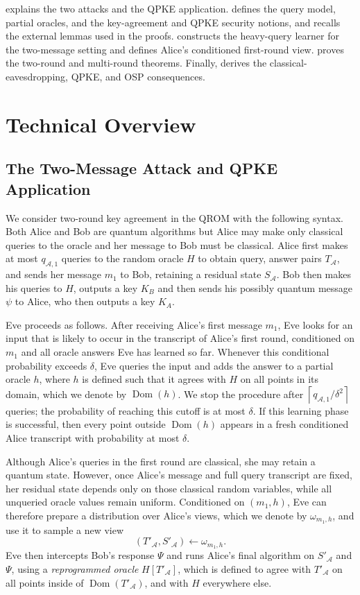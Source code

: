 \documentclass[11pt]{article}
\newcounter{algorithm}
\newcommand{\cA}{\mathcal{A}}
\newcommand{\Dom}{\operatorname{Dom}}
\newcommand{\ceil}[1]{\left\lceil #1\right\rceil}
\begin{document}
 explains the two attacks and the QPKE
application.   defines the query model, partial
oracles, and the key-agreement and QPKE security notions, and recalls the
external lemmas used in the proofs.   constructs the
heavy-query learner for the two-message setting and defines Alice's
conditioned first-round view.   proves the two-round and multi-round theorems.  Finally,  derives the classical-eavesdropping,
QPKE, and OSP consequences.

\section{Technical Overview}\label{sec:technical-overview}

\subsection{The Two-Message Attack and QPKE Application}

We consider two-round key agreement in the QROM with the following syntax. Both Alice and Bob are quantum algorithms but Alice may make only classical queries to the oracle and her message to Bob must be classical. Alice first makes at most $q_{\cA, 1}$ queries to the random oracle $H$ to obtain query, answer pairs $T_\cA$, and sends her message $m_1$ to Bob, retaining a residual state $S_\cA$. Bob then makes his queries to $H$, outputs a key $K_B$ and then sends his possibly quantum message $\psi$ to Alice, who then outputs a key $K_A$. 

Eve proceeds as follows. After receiving Alice's first message \(m_1\), Eve looks for an input that is
likely to occur in the transcript of Alice's first round, conditioned on
\(m_1\) and all oracle answers Eve has learned so far. Whenever this
conditional probability exceeds \(\delta\), Eve queries the input and adds
the answer to a partial oracle \(h\), where $h$ is defined such that it agrees with $H$ on all points in its domain, which we denote by $\Dom(h)$. We stop the procedure after
\(\ceil{q_{\cA,1}/\delta^2}\) queries; the probability of reaching this
cutoff is at most \(\delta\). If this learning phase is successful, then every point outside \(\Dom(h)\) 
appears in a fresh conditioned Alice transcript with probability at most
\(\delta\). 

Although Alice's queries in the first round are classical, she may retain a quantum
state. However, once Alice's message and full query transcript
are fixed, her residual state depends only on those classical random variables, while
all unqueried oracle values remain uniform. Conditioned on \((m_1,h)\), Eve
can therefore prepare a distribution over Alice's views, which we denote by $\omega_{m_1, h}$, and use it to sample a new view
\[
  (T'_{\cA},S'_{\cA})\leftarrow\omega_{m_1,h}.
\] 
Eve then intercepts Bob's response \(\Psi\) and runs Alice's final algorithm
on \(S'_{\cA}\) and \(\Psi\), using a \emph{reprogrammed oracle}
\(H[T'_{\cA}]\), which is defined to agree with $T'_\cA$ on all points inside of $\Dom(T'_{\cA})$, and with $H$ everywhere else. 
\end{document}
